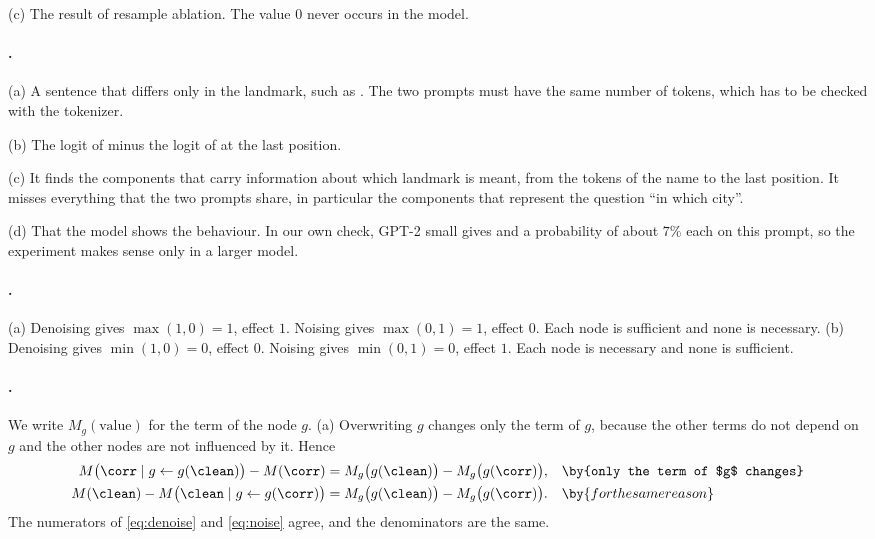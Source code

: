 {(c) The result of resample ablation. The value $0$ never occurs in the model.

\paragraph{.}
(a) A sentence that differs only in the landmark, such as . The two
prompts must have the same number of tokens, which has to be checked with the tokenizer.

(b) The logit of  minus the logit of  at the last position.

(c) It finds the components that carry information about which landmark is meant, from the tokens of the name to
the last position. It misses everything that the two prompts share, in particular the components that represent
the question ``in which city''.

(d) That the model shows the behaviour. In our own check, GPT-2 small gives  and  a
probability of about $7\%$ each on this prompt, so the experiment makes sense only in a larger model.

\paragraph{.}
(a) Denoising gives $\max(1,0)=1$, effect $1$. Noising gives $\max(0,1)=1$, effect $0$. Each node is sufficient and
none is necessary. (b) Denoising gives $\min(1,0)=0$, effect $0$. Noising gives $\min(0,1)=0$, effect $1$. Each node
is necessary and none is sufficient.

\paragraph{.}
We write $M_g(\text{value})$ for the term of the node $g$.
(a) Overwriting $g$ changes only the term of $g$, because the other terms do not depend on $g$ and the other nodes
are not influenced by it. Hence
\begin{align*}
M\big(\corr\mid g\leftarrow g(\clean)\big)-M(\corr) &= M_g\big(g(\clean)\big)-M_g\big(g(\corr)\big), && \by{only the term of $g$ changes}\\
M(\clean)-M\big(\clean\mid g\leftarrow g(\corr)\big) &= M_g\big(g(\clean)\big)-M_g\big(g(\corr)\big). && \by{for the same reason}
\end{align*}
The numerators of \eqref{eq:denoise} and \eqref{eq:noise} agree, and the denominators are the same.

}
